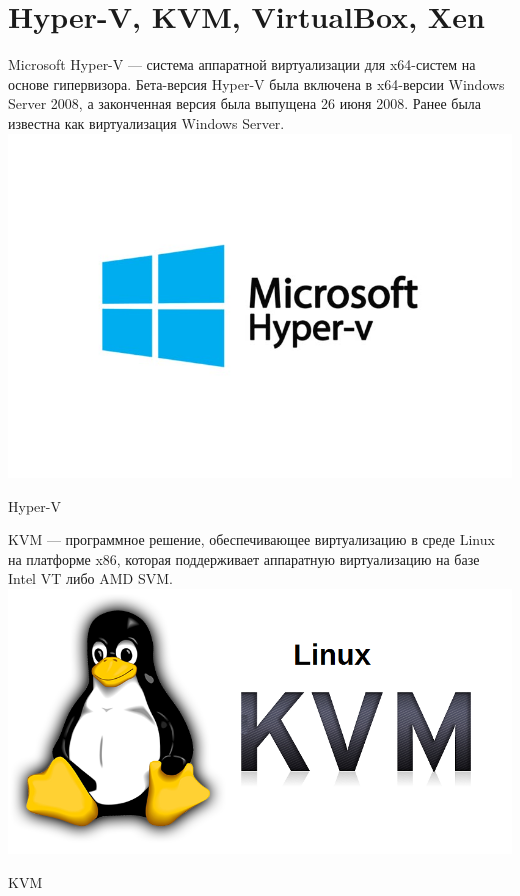\documentclass[a4paper,14pt]{extarticle}
\begin{document}
\section{ Hyper-V, KVM, VirtualBox, Xen}


\centering
Microsoft Hyper-V — система аппаратной виртуализации для x64-систем на основе гипервизора. Бета-версия Hyper-V была включена в x64-версии Windows Server 2008, а законченная версия была выпущена 26 июня 2008. Ранее была известна как виртуализация Windows Server. 
\includegraphics[width=0.9\linewidth]{Microsoft_Hyper_V.jpg}
\caption{Hyper-V}
\label{fig:mpr}



\centering
KVM — программное решение, обеспечивающее виртуализацию в среде Linux на платформе x86, которая поддерживает аппаратную виртуализацию на базе Intel VT либо AMD SVM.
\includegraphics[width=0.75\linewidth]{linux-kvm.png}
\caption{KVM}
\label{fig:mpr}
\end{document}
